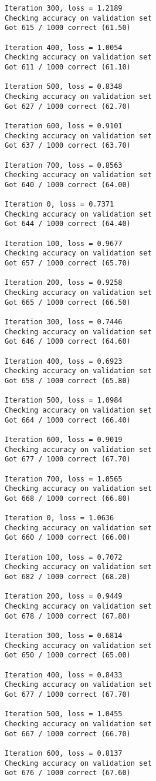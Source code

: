 \documentclass[11pt]{article}
\begin{document}
\begin{Verbatim}[commandchars=\\\{\}]
Iteration 300, loss = 1.2189
Checking accuracy on validation set
Got 615 / 1000 correct (61.50)

Iteration 400, loss = 1.0054
Checking accuracy on validation set
Got 611 / 1000 correct (61.10)

Iteration 500, loss = 0.8348
Checking accuracy on validation set
Got 627 / 1000 correct (62.70)

Iteration 600, loss = 0.9101
Checking accuracy on validation set
Got 637 / 1000 correct (63.70)

Iteration 700, loss = 0.8563
Checking accuracy on validation set
Got 640 / 1000 correct (64.00)

Iteration 0, loss = 0.7371
Checking accuracy on validation set
Got 644 / 1000 correct (64.40)

Iteration 100, loss = 0.9677
Checking accuracy on validation set
Got 657 / 1000 correct (65.70)

Iteration 200, loss = 0.9258
Checking accuracy on validation set
Got 665 / 1000 correct (66.50)

Iteration 300, loss = 0.7446
Checking accuracy on validation set
Got 646 / 1000 correct (64.60)

Iteration 400, loss = 0.6923
Checking accuracy on validation set
Got 658 / 1000 correct (65.80)

Iteration 500, loss = 1.0984
Checking accuracy on validation set
Got 664 / 1000 correct (66.40)

Iteration 600, loss = 0.9019
Checking accuracy on validation set
Got 677 / 1000 correct (67.70)

Iteration 700, loss = 1.0565
Checking accuracy on validation set
Got 668 / 1000 correct (66.80)

Iteration 0, loss = 1.0636
Checking accuracy on validation set
Got 660 / 1000 correct (66.00)

Iteration 100, loss = 0.7072
Checking accuracy on validation set
Got 682 / 1000 correct (68.20)

Iteration 200, loss = 0.9449
Checking accuracy on validation set
Got 678 / 1000 correct (67.80)

Iteration 300, loss = 0.6814
Checking accuracy on validation set
Got 650 / 1000 correct (65.00)

Iteration 400, loss = 0.8433
Checking accuracy on validation set
Got 677 / 1000 correct (67.70)

Iteration 500, loss = 1.0455
Checking accuracy on validation set
Got 667 / 1000 correct (66.70)

Iteration 600, loss = 0.8137
Checking accuracy on validation set
Got 676 / 1000 correct (67.60)


\end{Verbatim}
\end{document}
